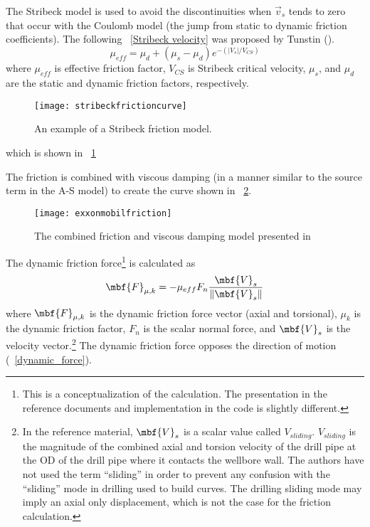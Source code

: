 The Stribeck model is used to avoid the discontinuities when $\vec{v}_s$ tends to zero that occur with the Coulomb model (the jump from static to dynamic friction coefficients). The following \equationname~\ref{Stribeck velocity} was proposed by Tunstin (\cite{ref:tustin1947a}).
\begin{equation}
	\label{Stribeck velocity}
	\mu_{eff} = \mu_{d} + (\mu_{s} - \mu_{d}) e^{-(|V_s|/V_{CS})}
\end{equation}
where $\mu_{eff}$ is effective friction factor, $V_{CS}$ is Stribeck critical velocity, $\mu_{s}$, and $\mu_{d}$ are the static and dynamic friction factors, respectively.


\begin{figure}
	\centering
	\texttt{[image: stribeckfrictioncurve]}
	\caption[Stribeck friction model]{An example of a Stribeck friction model.}
	\label{fig:stribeckfrictioncurve}
\end{figure}
which is shown in \figurename~\ref{fig:stribeckfrictioncurve}



The friction is combined with viscous damping (in a manner similar to the source term in the A-S model)  to create the curve shown in \figurename~\ref{fig:exxonmobilfriction}.
\begin{figure}
	\centering
	\texttt{[image: exxonmobilfriction]}
	\caption[Comparison of friction models]{The combined friction and viscous damping model presented in ~\cite{ref:dixit2021a}}
	\label{fig:exxonmobilfriction}
\end{figure}

The dynamic friction force\footnote{This is a conceptualization of the calculation. The presentation in the reference documents and implementation in the code is slightly different.} is calculated as
\begin{equation}\label{dynamic_force}
  \mbf{F}_{\mu,k} = - \mu_{eff} F_{n} \frac{\mbf{V}_{s}}{\|\mbf{V}_{s}\|}
\end{equation}
where $\mbf{F}_{\mu,k}$ is the dynamic friction force vector (axial and torsional), $\mu_k$ is the dynamic friction factor, $F_n$ is the scalar normal force, and $\mbf{V}_{s}$ is the velocity vector.\footnote{In the reference material, $\mbf{V}_{s}$ is a scalar value called $V_{sliding}$. $V_{sliding}$ is the magnitude of the combined axial and torsion velocity of the drill pipe at the OD of the drill pipe where it contacts the wellbore wall.  The authors have not used the term ``sliding'' in order to prevent any confusion with the ``sliding'' mode in drilling used to build curves.  The drilling sliding mode may imply an axial only displacement, which is not the case for the friction calculation.} The dynamic friction force opposes the direction of motion (\equationname~\ref{dynamic_force}).

